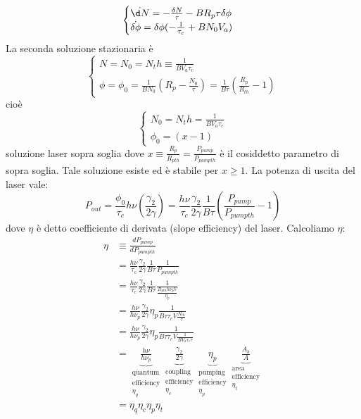 \documentclass{book}
\theoremstyle{remark}
\begin{document}
\begin{equation*}
\begin{cases}
\dot{\d N} = -\frac{\delta N}{\tau} - B R_p \tau \delta \phi\\
\dot{\delta \phi} = \delta\phi(-\frac{1}{\tau_c} + BN_0V_a) 
\end{cases}
\end{equation*}
La seconda soluzione stazionaria è
\begin{equation*}
\begin{cases}
N = N_0 = N_th \equiv \frac{1}{BV_a\tau_c}\\
\phi = \phi_0 = \frac{1}{BN_0} \left(R_p - \frac{N_0}{\tau}\right) = \frac{1}{B\tau} \left(\frac{R_p}{R_{th}} - 1\right)
\end{cases}
\end{equation*}
cioè
\begin{equation*}
\begin{cases}
N_0 = N_th = \frac{1}{BV_a\tau_c}\\
\phi_0 = (x - 1)
\end{cases}
\end{equation*}
soluzione laser sopra soglia
dove $x \equiv \frac{R_p}{R_{pth}} = \frac{P_{pump}}{P_{pump th}}$ è il cosiddetto parametro di sopra soglia. Tale soluzione esiste ed è stabile per $x \geq 1$.
La potenza di uscita del laser vale:
\begin{equation*}
P_{out} = \frac{\phi_0}{\tau_c}h\nu \left(\frac{\gamma_2}{2\gamma}\right) = \frac{h\nu}{\tau_c} \frac{\gamma_2}{2\gamma} \frac{1}{B\tau} \left(\frac{P_{pump}}{P_{pump th}} - 1\right)
\end{equation*}
dove $\eta$ è detto coefficiente di derivata (slope efficiency) del laser.
Calcoliamo $\eta$:
\begin{align*}
\eta &\equiv \frac{dP_{pump}}{dP_{pump th}}\\
&= \frac{h\nu}{\tau_c} \frac{\gamma_2}{2\gamma} \frac{1}{B\tau} \frac{1}{P_{pump th}}\\
&= \frac{h\nu}{\tau_c} \frac{\gamma_2}{2\gamma} \frac{1}{B\tau} \frac{1}{\frac{R_{p th} h\nu_p V}{\eta_p}}\\
&= \frac{h\nu}{h\nu_p} \frac{\gamma_2}{2\gamma} \eta_p \frac{1}{B\tau\tau_c V \frac{N_{th}}{\tau}}\\
&= \frac{h\nu}{h\nu_p} \frac{\gamma_2}{2\gamma} \eta_p \frac{1}{B\tau\tau_c V \frac{1}{BV_a\tau_c\tau}}\\
&= \underbrace{\frac{h\nu}{h\nu_p}}_{\substack{\text{quantum}\\ \text{efficiency}\\ \eta_q}} \underbrace{\frac{\gamma_2}{2\gamma}}_{\substack{\text{coupling}\\ \text{efficiency}\\ \eta_c}}\underbrace{\eta_p}_{\substack{\text{pumping}\\ \text{efficiency}\\ \eta_p}} \underbrace{\frac{A_b}{A}}_{\substack{\text{area}\\ \text{efficiency}\\ \eta_t}}\\
&= \eta_q \eta_c \eta_p \eta_t
\end{align*}
\end{document}
